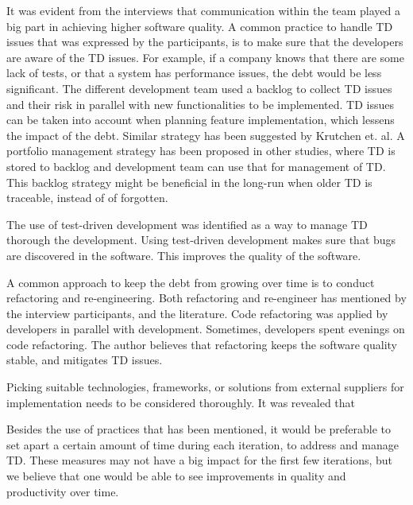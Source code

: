 It was evident from the interviews that communication within the team played a big part in achieving higher software quality. A common practice to handle TD issues that was expressed by the participants, is to make sure that the developers are aware of the TD issues. For example, if a company knows that there are some lack of tests, or that a system has performance issues, the debt would be less significant. The different development team used a backlog to collect TD issues and their risk in parallel with new functionalities to be implemented. TD issues can be taken into account when planning feature implementation, which lessens the impact of the debt. Similar strategy has been suggested by Krutchen et. al\cite{krutchen}. A portfolio management strategy has been proposed in other studies, where TD is stored to backlog and development team can use that for management of TD. This backlog strategy might be beneficial in the long-run when older TD is traceable, instead of of forgotten.

The use of test-driven development was identified as a way to manage TD thorough the development. Using test-driven development makes sure that bugs are discovered in the software. This improves the quality of the software.

A common approach to keep the debt from growing over time is to conduct refactoring and re-engineering. Both refactoring and re-engineer has mentioned by the interview participants, and the literature\cite{p8-codabux}. Code refactoring was applied by developers in parallel with development. Sometimes, developers spent evenings on code refactoring. The author believes that refactoring keeps the software quality stable, and mitigates TD issues. 

Picking suitable technologies, frameworks, or solutions from external suppliers for implementation needs to be considered thoroughly. It was revealed that 

Besides the use of practices that has been mentioned, it would be preferable to set apart a certain amount of time during each iteration, to address and manage TD. These measures may not have a big impact for the first few iterations, but we believe that one would be able to see improvements in quality and productivity over time.

